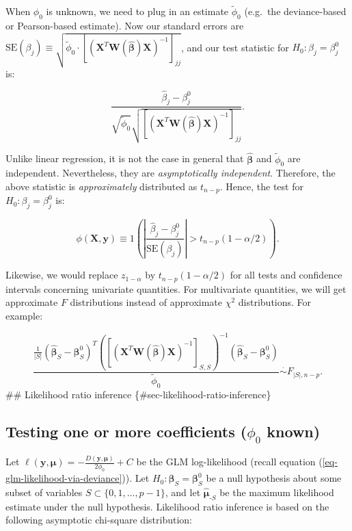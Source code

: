\documentclass[
  11pt,
  letterpaper,
  oneside]{book}
\theoremstyle{definition}
\theoremstyle{plain}
\theoremstyle{plain}
\theoremstyle{plain}
\theoremstyle{remark}
\begin{document}
When \(\phi_0\) is unknown, we need to plug in an estimate
\(\widetilde \phi_0\) (e.g.~the deviance-based or Pearson-based
estimate). Now our standard errors are
\(\text{SE}(\beta_j) \equiv \sqrt{\widetilde \phi_0 \cdot [(\boldsymbol{X}^T \boldsymbol{W}(\boldsymbol{\widehat \beta}) \boldsymbol{X})^{-1}]_{jj}}\),
and our test statistic for \(H_0: \beta_j = \beta_j^0\) is:

\[
\frac{\widehat \beta_j - \beta_j^0}{\sqrt{\widetilde \phi_0}\sqrt{[(\boldsymbol{X}^T \boldsymbol{W}(\boldsymbol{\widehat \beta}) \boldsymbol{X})^{-1}]_{jj}}}.
\]

Unlike linear regression, it is not the case in general that
\(\boldsymbol{\widehat \beta}\) and \(\widetilde \phi_0\) are
independent. Nevertheless, they are \emph{asymptotically independent}.
Therefore, the above statistic is \emph{approximately} distributed as
\(t_{n-p}\). Hence, the test for \(H_0: \beta_j = \beta_j^0\) is:

\[
\phi(\boldsymbol{X}, \boldsymbol{y}) \equiv 1\left(\left|\frac{\widehat \beta_j - \beta_j^0}{\text{SE}(\beta_j)}\right| > t_{n-p}(1-\alpha/2)\right).
\]

Likewise, we would replace \(z_{1-\alpha}\) by \(t_{n-p}(1-\alpha/2)\)
for all tests and confidence intervals concerning univariate quantities.
For multivariate quantities, we will get approximate \(F\) distributions
instead of approximate \(\chi^2\) distributions. For example:

\[
\frac{\frac{1}{|S|}(\boldsymbol{\widehat \beta}_S - \boldsymbol{\beta}_S^0)^T \left([(\boldsymbol{X}^T \boldsymbol{W}(\boldsymbol{\widehat \beta}) \boldsymbol{X})^{-1}]_{S,S}\right)^{-1}(\boldsymbol{\widehat \beta}_S - \boldsymbol{\beta}_S^0)}{\widetilde \phi_0} \overset{\cdot}{\sim} F_{|S|, n-p}.
\] \#\# Likelihood ratio inference \{\#sec-likelihood-ratio-inference\}

\hypertarget{sec-likelihood-ratio-coeff-known}{%
\subsection{\texorpdfstring{Testing one or more coefficients (\(\phi_0\)
known)}{Testing one or more coefficients (\textbackslash phi\_0 known)}}\label{sec-likelihood-ratio-coeff-known}}

Let
\(\ell(\boldsymbol{y}, \boldsymbol{\mu}) = -\frac{D(\boldsymbol{y}, \boldsymbol{\mu})}{2\phi_0} + C\)
be the GLM log-likelihood (recall equation
(\ref{eq-glm-likelihood-via-deviance})). Let
\(H_0: \boldsymbol{\beta}_S = \boldsymbol{\beta}_S^0\) be a null
hypothesis about some subset of variables
\(S \subset \{0, 1, \dots, p-1\}\), and let
\(\boldsymbol{\widehat{\mu}}_{\text{-}S}\) be the maximum likelihood
estimate under the null hypothesis. Likelihood ratio inference is based
on the following asymptotic chi-square distribution:
\end{document}

